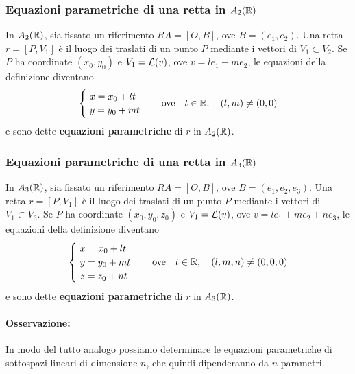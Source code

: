 \subsubsection{Equazioni parametriche di una retta in \(A_2(\RR )\)} 
In \(A_2(\RR )\), sia fissato un riferimento \(RA = [O, B]\), ove \(B = (e_1, e_2)\). Una retta \(r = [P, V_1]\) è il luogo dei traslati di un punto \(P\) mediante i vettori di \(V_1 \subset V_2\). Se \(P\) ha coordinate \((x_0, y_0)\) e \(V_1 = \mathcal{L}(v) \), ove \(v = le_1 + me_2\), le equazioni della definizione diventano \[
\begin{cases}
    \ x = x_0 + lt \\
    \ y = y_0 + mt \\
\end{cases}
\quad \text{ove}\quad t \in \RR , \quad (l,m) \neq (0,0)\] 
e sono dette \textbf{equazioni parametriche} di \(r\) in \(A_2(\RR )\).

\subsubsection{Equazioni parametriche di una retta in \(A_3(\RR )\)}
In \(A_3(\RR )\), sia fissato un riferimento \(RA = [O, B]\), ove \(B = (e_1, e_2, e_3)\). Una retta \(r = [P, V_1]\) è il luogo dei traslati di un punto \(P\) mediante i vettori di \(V_1 \subset V_3\). Se \(P\) ha coordinate \((x_0, y_0, z_0)\) e \(V_1 = \mathcal{L}(v) \), ove \(v = le_1 + me_2 + ne_3\), le equazioni della definizione diventano \[
\begin{cases}
    \ x = x_0 + lt \\
    \ y = y_0 + mt \\
    \ z = z_0 + nt \\
\end{cases}
\quad \text{ove}\quad t \in \RR , \quad (l,m,n) \neq (0,0,0)\] 
e sono dette \textbf{equazioni parametriche} di \(r\) in \(A_3(\RR )\).

\paragraph{Osservazione:} In modo del tutto analogo possiamo determinare le equazioni parametriche di sottospazi lineari di dimensione \(n\), che quindi dipenderanno da \(n\) parametri.

